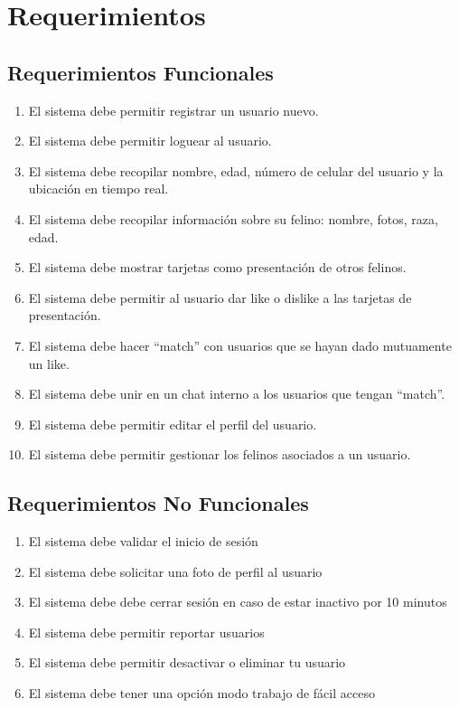 \documentclass{article}
\begin{document}
\section{Requerimientos}
\subsection{Requerimientos Funcionales}
\begin{enumerate}
    \item El sistema debe permitir registrar un usuario nuevo.
    \item El sistema debe permitir loguear al usuario.
    \item El sistema debe recopilar nombre, edad, número de celular del usuario y la ubicación en tiempo real.
    \item El sistema debe recopilar información sobre su felino: nombre, fotos, raza, edad.
    \item El sistema debe mostrar tarjetas como presentación de otros felinos.
    \item El sistema debe permitir al usuario dar like o dislike a las tarjetas de presentación.
    \item El sistema debe hacer “match” con usuarios que se hayan dado mutuamente un like.
    \item El sistema debe unir en un chat interno a los usuarios que tengan “match”.
    \item El sistema debe permitir editar el perfil del usuario.
    \item El sistema debe permitir gestionar los felinos asociados a un usuario.
\end{enumerate}
\subsection{Requerimientos No Funcionales}
\begin{enumerate}
    \item El sistema debe validar el inicio de sesión
    \item El sistema debe solicitar una foto de perfil al usuario
    \item El sistema debe debe cerrar sesión en caso de estar inactivo por 10 minutos
    \item El sistema debe permitir reportar usuarios
    \item El sistema debe permitir desactivar o eliminar tu usuario
    \item El sistema debe tener una opción modo trabajo de fácil acceso
\end{enumerate}
\clearpage
\end{document}
